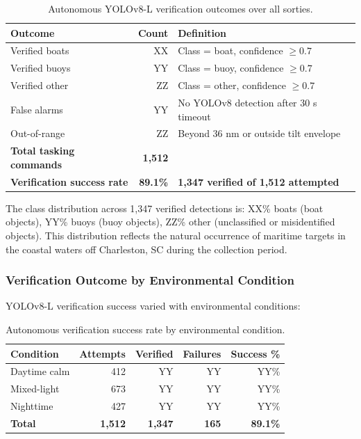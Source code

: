 \documentclass[conf]{asmeconf}
\begin{document}
\begin{table}[t]
\caption{Autonomous YOLOv8-L verification outcomes over all sorties.}
\label{tab:verification_autonomous}
\centering
\small
\begin{tabular}{@{}lrp{4cm}@{}}
\toprule
Outcome & Count & Definition \\
\midrule
Verified boats & XX & Class = boat, confidence $\geq 0.7$ \\
\midrule
Verified buoys & YY & Class = buoy, confidence $\geq 0.7$ \\
\midrule
Verified other & ZZ & Class = other, confidence $\geq 0.7$ \\
\midrule
False alarms & YY & No YOLOv8 detection after 30 s timeout \\
\midrule
Out-of-range & ZZ & Beyond 36 nm or outside tilt envelope \\
\midrule
\textbf{Total tasking commands} & \textbf{1,512} & \\
\midrule
\textbf{Verification success rate} & \textbf{89.1\%} & \textbf{1,347 verified of 1,512 attempted} \\
\bottomrule
\end{tabular}
\end{table}

The class distribution across 1,347 verified detections is: XX\% boats (boat objects), YY\% buoys (buoy objects), ZZ\% other (unclassified or misidentified objects). This distribution reflects the natural occurrence of maritime targets in the coastal waters off Charleston, SC during the collection period.

\subsubsection{Verification Outcome by Environmental Condition}

YOLOv8-L verification success varied with environmental conditions:

\begin{table}[t]
\caption{Autonomous verification success rate by environmental condition.}
\label{tab:verification_by_condition}
\centering
\small
\begin{tabular}{@{}lrrrr@{}}
\toprule
Condition & Attempts & Verified & Failures & Success \% \\
\midrule
Daytime calm & 412 & YY & YY & YY\% \\
Mixed-light & 673 & YY & YY & YY\% \\
Nighttime & 427 & YY & YY & YY\% \\
\midrule
\textbf{Total} & \textbf{1,512} & \textbf{1,347} & \textbf{165} & \textbf{89.1\%} \\
\bottomrule
\end{tabular}
\end{table}
\end{document}
